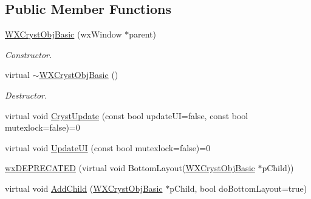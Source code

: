 \subsection*{Public Member Functions}
\begin{DoxyCompactItemize}
\item 
\mbox{\label{class_obj_cryst_1_1_w_x_cryst_obj_basic_a8a3a509d68db6e80af6912e4b03b340b}} 
\mbox{\hyperlink{class_obj_cryst_1_1_w_x_cryst_obj_basic_a8a3a509d68db6e80af6912e4b03b340b}{W\+X\+Cryst\+Obj\+Basic}} (wx\+Window $\ast$parent)
\begin{DoxyCompactList}\small\item\em Constructor. \end{DoxyCompactList}\item 
\mbox{\label{class_obj_cryst_1_1_w_x_cryst_obj_basic_a13cb1efa2920658cf905da4d8b9ff2aa}} 
virtual \mbox{\hyperlink{class_obj_cryst_1_1_w_x_cryst_obj_basic_a13cb1efa2920658cf905da4d8b9ff2aa}{$\sim$\+W\+X\+Cryst\+Obj\+Basic}} ()
\begin{DoxyCompactList}\small\item\em Destructor. \end{DoxyCompactList}\item 
virtual void \mbox{\hyperlink{class_obj_cryst_1_1_w_x_cryst_obj_basic_a7ac00ae2ae28f1a6fa26e6fa571186b6}{Cryst\+Update}} (const bool update\+UI=false, const bool mutexlock=false)=0
\item 
virtual void \mbox{\hyperlink{class_obj_cryst_1_1_w_x_cryst_obj_basic_a3818940b7031ff7e45cf2178c4a99c90}{Update\+UI}} (const bool mutexlock=false)=0
\item 
\mbox{\hyperlink{class_obj_cryst_1_1_w_x_cryst_obj_basic_a4c3fd7a3493369a505725843ef05ac02}{wx\+D\+E\+P\+R\+E\+C\+A\+T\+ED}} (virtual void Bottom\+Layout(\mbox{\hyperlink{class_obj_cryst_1_1_w_x_cryst_obj_basic}{W\+X\+Cryst\+Obj\+Basic}} $\ast$p\+Child))
\item 
virtual void \mbox{\hyperlink{class_obj_cryst_1_1_w_x_cryst_obj_basic_a9f40abffff18b23ca2c616fdb8ad6dd6}{Add\+Child}} (\mbox{\hyperlink{class_obj_cryst_1_1_w_x_cryst_obj_basic}{W\+X\+Cryst\+Obj\+Basic}} $\ast$p\+Child, bool do\+Bottom\+Layout=true)
\item 
\mbox{\label{class_obj_cryst_1_1_w_x_cryst_obj_basic_a817b44f6ddcd899435c24d7bb18182f4}} 

\end{DoxyCompactItemize}
